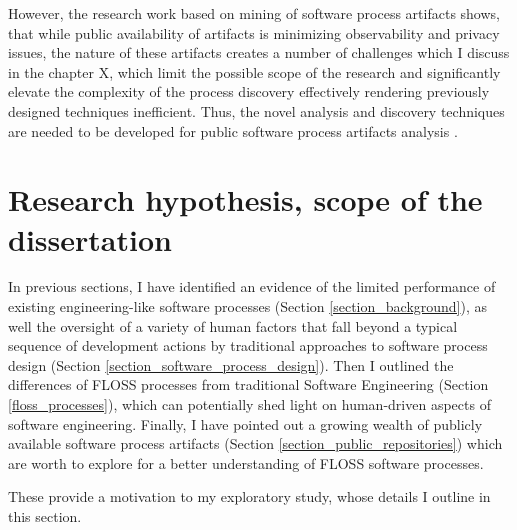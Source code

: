 However, the research work based on mining of software process artifacts shows, that while public availability 
of artifacts is minimizing observability and privacy issues, the nature of these artifacts creates a number of 
challenges which I discuss in the chapter X, which limit the possible scope of the research and significantly 
elevate the complexity of the process discovery effectively rendering previously designed techniques inefficient.
Thus, the novel analysis and discovery techniques are needed to be developed for public software process artifacts 
analysis \cite{citeulike:7853299}.

%
%
\section{Research hypothesis, scope of the dissertation}\label{section_research_hypothesis}
In previous sections, I have identified an evidence of the limited performance of existing engineering-like 
software processes (Section \ref{section_background}),
as well the oversight of a variety of human factors that fall beyond a typical sequence of development 
actions by traditional approaches to software process design (Section \ref{section_software_process_design}).
Then I outlined the differences of FLOSS processes from traditional Software Engineering 
(Section \ref{floss_processes}), which can potentially shed light on human-driven aspects of software engineering.
Finally, I have pointed out a growing wealth of publicly available software process artifacts 
(Section \ref{section_public_repositories}) which are worth to explore for a better understanding of FLOSS 
software processes.

These provide a motivation to my exploratory study, whose details I outline in this section.

